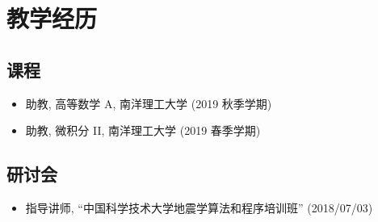 \section{教学经历}

\subsection{课程}
\begin{itemize}
\item 助教, 高等数学 A, 南洋理工大学 (2019 秋季学期)
\item 助教, 微积分 II, 南洋理工大学 (2019 春季学期)
\end{itemize}

\subsection{研讨会}
\begin{itemize}
\item 指导讲师, ``中国科学技术大学地震学算法和程序培训班'' (2018/07/03)
\end{itemize}
